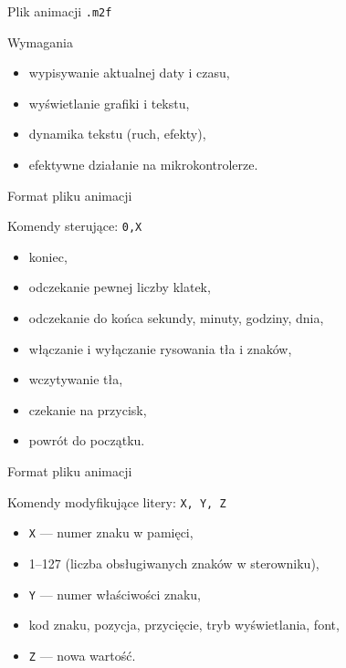 \documentclass{beamer}
\begin{document}
\begin{frame}{Plik animacji \texttt{.m2f}}
	\begin{block}{Wymagania}
		\begin{itemize}
			\item wypisywanie aktualnej daty i czasu,
			\item wyświetlanie grafiki i tekstu,
			\item dynamika tekstu (ruch, efekty),
			\item efektywne działanie na mikrokontrolerze.
		\end{itemize}
	\end{block}
\end{frame}

\begin{frame}{Format pliku animacji}
	\begin{block}{Komendy sterujące: \texttt{0,X}}
		\begin{itemize}
			\item koniec,
			\item odczekanie pewnej liczby klatek,
			\item odczekanie do końca sekundy, minuty, godziny, dnia,
			\item włączanie i wyłączanie rysowania tła i znaków,
			\item wczytywanie tła,
			\item czekanie na przycisk,
			\item powrót do początku.
		\end{itemize}
	\end{block}
\end{frame}

\begin{frame}{Format pliku animacji}
	\begin{block}{Komendy modyfikujące litery: \texttt{X, Y, Z}}
		\begin{itemize}
			\item \texttt{X} --- numer znaku w pamięci,
			\item 1--127 (liczba obsługiwanych znaków w sterowniku),
			\item \texttt{Y} --- numer właściwości znaku,
			\item kod znaku, pozycja, przycięcie, tryb wyświetlania, font,
			\item \texttt{Z} --- nowa wartość.
		\end{itemize}
	\end{block}
\end{frame}
\end{document}
